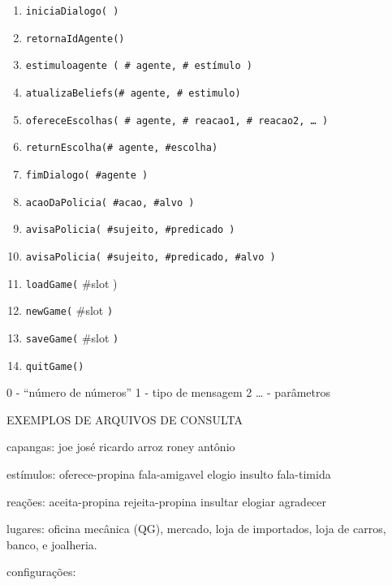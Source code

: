 \begin{enumerate}\footnotesize
\item \verb!iniciaDialogo( )!
\item \verb!retornaIdAgente()!
%
\item \verb!estimuloagente ( # agente, # estímulo )!
\item \verb!atualizaBeliefs(# agente, # estimulo)!
%
\item \verb!ofereceEscolhas( # agente, # reacao1, # reacao2, … )!
\item \verb!returnEscolha(# agente, #escolha)!
%
%
\item \verb!fimDialogo( #agente )!
\item \verb!acaoDaPolicia( #acao, #alvo )!
%



%
\item \verb!avisaPolicia( #sujeito, #predicado )!
\item \verb!avisaPolicia( #sujeito, #predicado, #alvo )!
%
%
%

%
\item \verb!loadGame(! \#slot )
\item \verb!newGame(! \#slot \verb!)!
\item \verb!saveGame(! \#slot \verb!)!
\item \verb!quitGame()!
\end{enumerate}

0 - “número de números”
1 - tipo de mensagem
2 … - parâmetros

EXEMPLOS DE ARQUIVOS DE CONSULTA

capangas:
joe
josé
ricardo
arroz
roney
antônio

estímulos:
oferece-propina
fala-amigavel
elogio
insulto
fala-timida

reações:
aceita-propina
rejeita-propina
insultar
elogiar
agradecer

lugares:
oficina mecânica (QG),
mercado,
loja de importados,
loja de carros,
banco, e
joalheria.

configurações:




